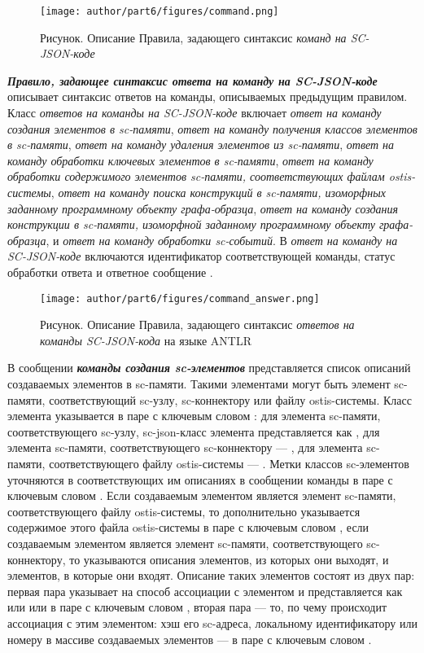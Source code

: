 \begin{figure}[htbp]
  \center
   \caption{Рисунок. Описание Правила, задающего синтаксис \textit{команд на SC-JSON-коде}}
  \texttt{[image: author/part6/figures/command.png]}
  \label{fig:command}
\end{figure}

\textbf{\textit{Правило, задающее синтаксис \textit{ответа на команду на SC-JSON-коде}} }описывает синтаксис ответов на команды, описываемых предыдущим правилом. Класс \textit{ответов на команды на SC-JSON-коде} включает \textit{ответ на команду создания элементов в sc-памяти}, \textit{ответ на команду получения классов элементов в sc-памяти}, \textit{ответ на команду удаления элементов из sc-памяти}, \textit{ответ на команду обработки ключевых элементов в sc-памяти}, \textit{ответ на команду обработки содержимого элементов sc-памяти, соответствующих файлам ostis-системы}, \textit{ответ на команду поиска конструкций в sc-памяти, изоморфных заданному программному объекту графа-образца}, \textit{ответ на команду создания конструкции в sc-памяти, изоморфной заданному программному объекту графа-образца}, и \textit{ответ на команду обработки sc-событий}. В \textit{ответ на команду на SC-JSON-коде} включаются идентификатор соответствующей команды, статус обработки ответа и ответное сообщение .

\begin{figure}[htbp]
  \center
	\caption{Рисунок. Описание Правила, задающего синтаксис \textit{ответов на команды SC-JSON-кода} на языке ANTLR}
  \texttt{[image: author/part6/figures/command\_answer.png]}
  \label{fig:command_answer}
\end{figure}

В сообщении \textbf{\textit{команды создания sc-элементов}} представляется список описаний создаваемых элементов в sc-памяти. Такими элементами могут быть элемент sc-памяти, соответствующий sc-узлу, sc-коннектору или файлу ostis-системы. Класс элемента указывается в паре с ключевым словом : для элемента sc-памяти, соответствующего sc-узлу, sc-json-класс элемента представляется как , для элемента sc-памяти, соответствующего sc-коннектору --- , для элемента sc-памяти, соответствующего файлу ostis-системы --- . Метки классов sc-элементов уточняются в соответствующих им описаниях в сообщении команды в паре с ключевым словом . Если создаваемым элементом является элемент sc-памяти, соответствующего файлу ostis-системы, то дополнительно указывается содержимое этого файла ostis-системы в паре с ключевым словом , если создаваемым элементом является элемент sc-памяти, соответствующего sc-коннектору, то указываются описания элементов, из которых они выходят, и элементов, в которые они входят. Описание таких элементов состоят из двух пар: первая пара указывает на способ ассоциации с элементом и представляется как  или  или  в паре с ключевым словом , вторая пара --- то, по чему происходит ассоциация с этим элементом: хэш его sc-адреса, локальному идентификатору или номеру в массиве создаваемых элементов --- в паре с ключевым словом  .


